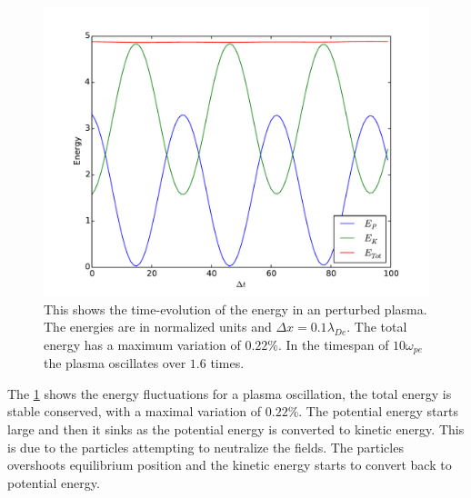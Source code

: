 		\begin{figure}
			\label{fig:oscillation}
			\includegraphics[width = \textwidth]{figures/verification/langmuirWave/energyPlot}
			\caption{This shows the time-evolution of the energy in an perturbed plasma. The energies are
			in normalized units and \(\Delta x = 0.1 \lambda_{De}\). The total energy has a maximum variation of \(0.22\%\). In the timespan
			of \(10\omega_{pe}\) the plasma oscillates over \(1.6\) times.}
		\end{figure}

		The \cref{fig:oscillation} shows the energy fluctuations for a plasma oscillation, the total energy
		is stable conserved, with a maximal variation of \(0.22\%\). The potential energy starts large
		and then it sinks as the potential energy is converted to kinetic energy. This is due to the particles
		attempting to neutralize the fields. The particles overshoots equilibrium position and the kinetic
		energy starts to convert back to potential energy.
